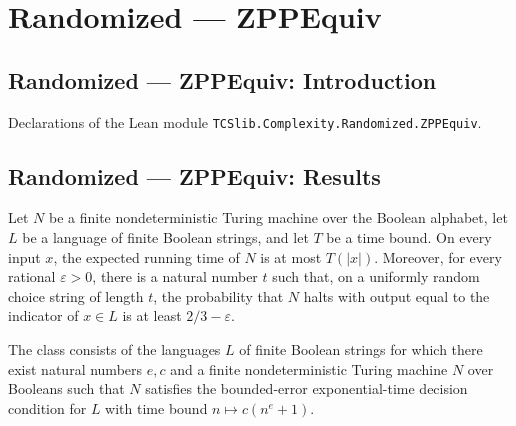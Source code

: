 \section{Randomized --- ZPPEquiv}
\subsection*{Randomized --- ZPPEquiv: Introduction}

Declarations of the Lean module \texttt{TCSlib.Complexity.Randomized.ZPPEquiv}.

\subsection*{Randomized --- ZPPEquiv: Results}

\begin{definition}
\label{Turing.FinNDTM.BPDecidesInExpTime}
\leanok
{}
Let $N$ be a finite nondeterministic Turing machine over the Boolean alphabet, let $L$ be
a language of finite Boolean strings, and let $T$ be a time bound. On every input $x$,
the expected running time of $N$ is at most $T(|x|)$. Moreover, for every rational
$\varepsilon>0$, there is a natural number $t$ such that, on a uniformly random
choice string of length $t$, the probability that $N$ halts with output equal to the
indicator of $x\in L$ is at least $2/3-\varepsilon$.
\end{definition}

\begin{definition}
\label{Randomized.BPP_ExpPTM}
\leanok
{}
The class consists of the languages $L$ of finite Boolean strings for which there exist
natural numbers $e,c$ and a finite nondeterministic Turing machine $N$ over Booleans
such that $N$ satisfies the bounded-error exponential-time decision condition for $L$
with time bound $n\mapsto c(n^e+1)$.
\end{definition}

